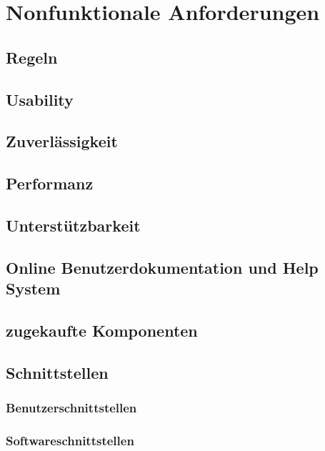\documentclass[a4paper,12pt,twoside]{scrreprt}
\begin{document}
    \chapter{Nonfunktionale Anforderungen  }
    \section{Regeln}
        
    \section{Usability}
        
    \section{Zuverlässigkeit}
        
    \section{Performanz}
        
    \section{Unterstützbarkeit}
        
    \section{Online Benutzerdokumentation und Help System}
        
    \section{zugekaufte Komponenten}
        
    \section{Schnittstellen}
    \subsection{Benutzerschnittstellen}
        
    \subsection{Softwareschnittstellen}
        
\end{document}
